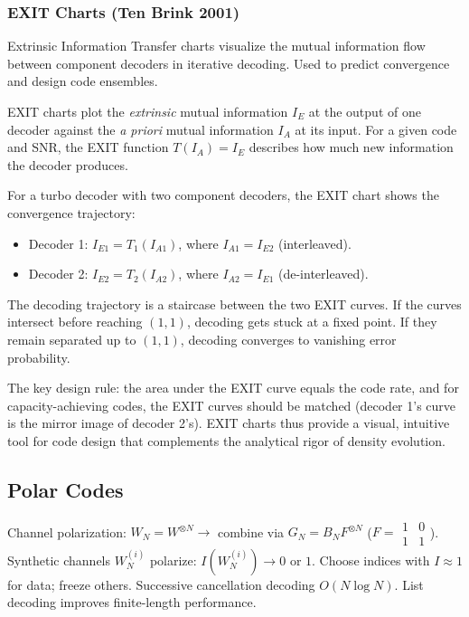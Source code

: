 \subsubsection*{EXIT Charts (Ten Brink 2001)}
Extrinsic Information Transfer charts visualize the mutual information flow between component decoders in iterative decoding. Used to predict convergence and design code ensembles.

EXIT charts plot the \emph{extrinsic} mutual information $I_E$ at the output of one decoder against the \emph{a priori} mutual information $I_A$ at its input. For a given code and SNR, the EXIT function $T(I_A) = I_E$ describes how much new information the decoder produces.

For a turbo decoder with two component decoders, the EXIT chart shows the convergence trajectory:
\begin{itemize}
\item Decoder 1: $I_{E1} = T_1(I_{A1})$, where $I_{A1} = I_{E2}$ (interleaved).
\item Decoder 2: $I_{E2} = T_2(I_{A2})$, where $I_{A2} = I_{E1}$ (de-interleaved).
\end{itemize}

The decoding trajectory is a staircase between the two EXIT curves. If the curves intersect before reaching $(1,1)$, decoding gets stuck at a fixed point. If they remain separated up to $(1,1)$, decoding converges to vanishing error probability.

The key design rule: the area under the EXIT curve equals the code rate, and for capacity-achieving codes, the EXIT curves should be matched (decoder 1's curve is the mirror image of decoder 2's). EXIT charts thus provide a visual, intuitive tool for code design that complements the analytical rigor of density evolution.

\subsection{Polar Codes}
\label{sec:ec:polar}

Channel polarization: $W_N = W^{\otimes N} \to$ combine via $G_N = B_N F^{\otimes N}$ ($F = \begin{smallmatrix}1&0\\1&1\end{smallmatrix}$). Synthetic channels $W_N^{(i)}$ polarize: $I(W_N^{(i)}) \to 0$ or $1$. Choose indices with $I \approx 1$ for data; freeze others. Successive cancellation decoding $O(N \log N)$. List decoding improves finite-length performance.

